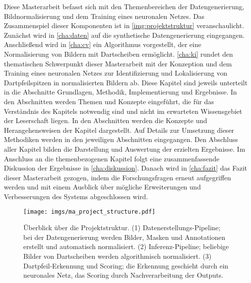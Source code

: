 Diese Masterarbeit befasst sich mit den Themenbereichen der Datengenerierung, Bildnormalisierung und dem Training eines neuronalen Netzes. Das Zusammenspiel dieser Komponenten ist in \autoref{img:projektstruktur} veranschaulicht. Zunächst wird in \autoref{cha:daten} auf die synthetische Datengenerierung eingegangen. Anschließend wird in \autoref{cha:cv} ein Algorithmus vorgestellt, der eine Normalisierung von Bildern mit Dartscheiben ermöglicht. \autoref{cha:ki} rundet den thematischen Schwerpunkt dieser Masterarbeit mit der Konzeption und dem Training eines neuronalen Netzes zur Identifizierung und Lokalisierung von Dartpfeilspitzen in normalisierten Bildern ab. Diese Kapitel sind jeweils unterteilt in die Abschnitte Grundlagen, Methodik, Implementierung und Ergebnisse. In den Abschnitten  werden Themen und Konzepte eingeführt, die für das Verständnis des Kapitels notwendig sind und nicht im erwarteten Wissensgebiet der Leserschaft liegen. In den Abschnitten  werden die Konzepte und Herangehensweisen der Kapitel dargestellt. Auf Details zur Umsetzung dieser Methodiken werden in den jeweiligen Abschnitten  eingegangen. Den Abschluss aller Kapitel bilden die Darstellung und Auswertung der erzielten Ergebnisse. Im Anschluss an die themenbezogenen Kapitel folgt eine zusammenfassende Diskussion der Ergebnisse in \autoref{cha:diskussion}. Danach wird in \autoref{cha:fazit} das Fazit dieser Masterarbeit gezogen, indem die Forschungsfragen erneut aufgegriffen werden und mit einem Ausblick über mögliche Erweiterungen und Verbesserungen des Systems abgeschlossen wird.

\begin{figure}
    \centering
    \texttt{[image: imgs/ma\_project\_structure.pdf]}
    \caption{Überblick über die Projektstruktur. (1) Datenerstellungs-Pipeline; bei der Datengenerierung werden Bilder, Masken und Annotationen erstellt und automatisch normalisiert. (2) Inferenz-Pipeline; beliebige Bilder von Dartscheiben werden algorithmisch normalisiert. (3) Dartpfeil-Erkennung und Scoring; die Erkennung geschieht durch ein neuronales Netz, das Scoring durch Nachverarbeitung der Outputs.}
    \label{img:projektstruktur}
\end{figure}

